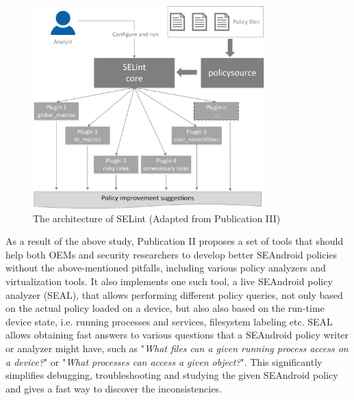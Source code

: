 \begin{figure}[t]
	\centering
		\includegraphics[width=0.80\textwidth]{figures/selint.png}
	\caption{The architecture of SELint (Adapted from Publication III)}
	\label{fig:selint}
\end{figure}

As a result of the above study, Publication II proposes a set of tools that should help both OEMs and security researchers to develop better SEAndroid policies without the above-mentioned pitfalls, including various policy analyzers and virtualization tools. It also implements one such tool, a live SEAndroid policy analyzer (SEAL), that allows performing different policy queries, not only based on the actual policy loaded on a device, but also also based on the run-time device state, i.e. running processes and services, filesystem labeling etc. SEAL allows obtaining fast answers to various questions that a SEAndroid policy writer or analyzer might have, such as "\textit{What files can a given running process access on a device?}" or "\textit{What processes can access a given object?}". This significantly simplifies debugging, troubleshooting and studying the given SEAndroid policy and gives a fast way to discover the inconsistencies. 

